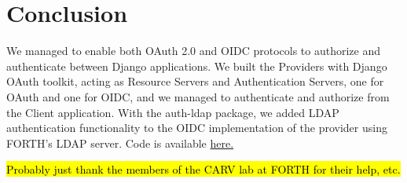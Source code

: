 \section{Conclusion}
We managed to enable both OAuth 2.0 and OIDC protocols to authorize and authenticate between Django applications. We built the Providers with Django OAuth toolkit, acting as Resource Servers and Authentication Servers, one for OAuth and one for OIDC, and we managed to authenticate and authorize from the Client application. With the auth-ldap package, we added LDAP authentication functionality to the OIDC implementation of the provider using FORTH's LDAP server. Code is available \href{https://github.com/CARV-ICS-FORTH/django-oauth2-oidc-example}{here.}


\begin{acks}
\hl{Probably just thank the members of the CARV lab at FORTH for their help, etc.}
\end{acks}
